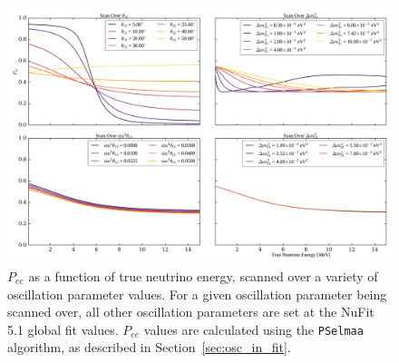 \begin{figure}[!th]
    \centering
    \includegraphics[width=\textwidth]{6_SolarAnalysis/images/pee_scan_plots.pdf}
    \caption[$P_{ee}$ as a function of true neutrino energy, scanned over a variety of oscillation parameter values]
    {$P_{ee}$ as a function of true neutrino energy, scanned over a variety of oscillation parameter values. For a given oscillation parameter being scanned over, all other oscillation parameters are set at the NuFit 5.1 global fit values. $P_{ee}$ values are calculated using the \texttt{PSelmaa} algorithm, as described in Section~\ref{sec:osc_in_fit}.}
    \label{fig:pee_osc_param_dependence}
\end{figure}

